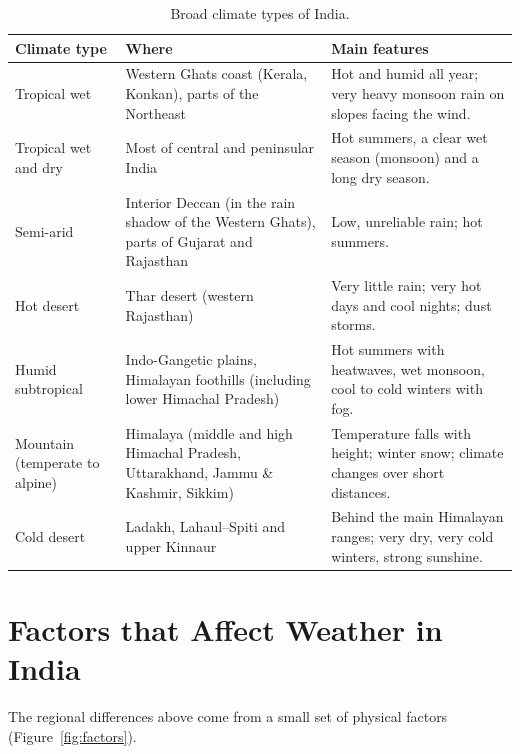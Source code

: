 \begin{table}[H]\footnotesize
\centering
\caption{Broad climate types of India.}
\label{tab:climtypes}
\begin{tabular}{|p{3.2cm}|p{4.2cm}|p{7.0cm}|}
\hline
\textbf{Climate type} & \textbf{Where} & \textbf{Main features}\\ \hline
Tropical wet & Western Ghats coast (Kerala, Konkan), parts of the Northeast & Hot and humid all year; very heavy
monsoon rain on slopes facing the wind.\\ \hline
Tropical wet and dry & Most of central and peninsular India & Hot summers, a clear wet season (monsoon) and a long dry
season.\\ \hline
Semi-arid & Interior Deccan (in the rain shadow of the Western Ghats), parts of Gujarat and Rajasthan & Low, unreliable
rain; hot summers.\\ \hline
Hot desert & Thar desert (western Rajasthan) & Very little rain; very hot days and cool nights; dust storms.\\ \hline
Humid subtropical & Indo-Gangetic plains, Himalayan foothills (including lower Himachal Pradesh) & Hot summers with
heatwaves, wet monsoon, cool to cold winters with fog.\\ \hline
Mountain (temperate to alpine) & Himalaya (middle and high Himachal Pradesh, Uttarakhand, Jammu \& Kashmir, Sikkim)
& Temperature falls with height; winter snow; climate changes over short distances.\\ \hline
Cold desert & Ladakh, Lahaul--Spiti and upper Kinnaur & Behind the main Himalayan ranges; very dry, very cold
winters, strong sunshine.\\ \hline
\end{tabular}
\end{table}

\section{Factors that Affect Weather in India}
The regional differences above come from a small set of physical factors (Figure~\ref{fig:factors}).

